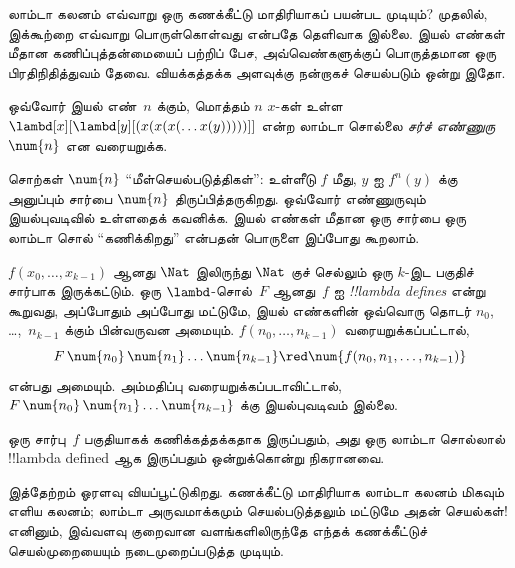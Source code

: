 \documentclass[../../../include/open-logic-section]{subfiles}
\begin{document}

லாம்டா கலனம் எவ்வாறு ஒரு கணக்கீட்டு மாதிரியாகப் பயன்பட முடியும்? முதலில்,
இக்கூற்றை எவ்வாறு பொருள்கொள்வது என்பதே தெளிவாக இல்லை. இயல் எண்கள் மீதான
கணிப்புத்தன்மையைப் பற்றிப் பேச, அவ்வெண்களுக்குப் பொருத்தமான ஒரு பிரதிநிதித்துவம்
தேவை. வியக்கத்தக்க அளவுக்கு நன்றாகச் செயல்படும் ஒன்று இதோ.

\begin{defn}
ஒவ்வோர் இயல் எண்~$n$ க்கும், மொத்தம் $n$ $x$-கள் உள்ள
$\lambd[x][\lambd[y][(x(x(x(\dots x(y)))))]]$ என்ற லாம்டா சொல்லை
\emph{சர்ச் எண்ணுரு}~$\num{n}$ என வரையறுக்க.
\end{defn}

சொற்கள் $\num{n}$ ``மீள்செயல்படுத்திகள்'': உள்ளீடு $f$ மீது, $y$ ஐ
$f^n(y)$ க்கு அனுப்பும் சார்பை $\num{n}$ திருப்பித்தருகிறது. ஒவ்வோர் எண்ணுருவும்
இயல்புவடிவில் உள்ளதைக் கவனிக்க. இயல் எண்கள் மீதான ஒரு சார்பை ஒரு லாம்டா சொல்
``கணிக்கிறது'' என்பதன் பொருளை இப்போது கூறலாம்.

\begin{defn}
$f(x_0, \dots, x_{k-1})$ ஆனது $\Nat$ இலிருந்து $\Nat$ குச் செல்லும் ஒரு
$k$-இட பகுதிச் சார்பாக இருக்கட்டும். ஒரு $\lambd$-சொல்~$F$ ஆனது~$f$ ஐ
\emph{!!{lambda define}s} என்று கூறுவது, அப்போதும் அப்போது மட்டுமே, இயல்
எண்களின் ஒவ்வொரு தொடர் $n_0$, \dots,~$n_{k-1}$ க்கும் பின்வருவன அமையும்.
$f(n_0, \dots, n_{k-1})$ வரையறுக்கப்பட்டால்,
\[
F\, \num{n_0}\, \num{n_1} \dots \num{n_{k-1}} \red \num{f(n_0, n_1, \dots,
  n_{k-1})}
\]
என்பது அமையும்.
அம்மதிப்பு வரையறுக்கப்படாவிட்டால், $F\, \num{n_0}\,
\num{n_1} \dots \num{n_{k-1}}$ க்கு இயல்புவடிவம் இல்லை.
\end{defn}

\begin{thm}
ஒரு சார்பு~$f$ பகுதியாகக் கணிக்கத்தக்கதாக இருப்பதும், அது ஒரு லாம்டா சொல்லால்
!!{lambda defined} ஆக இருப்பதும் ஒன்றுக்கொன்று நிகரானவை.
\end{thm}

\begin{explain}
இத்தேற்றம் ஓரளவு வியப்பூட்டுகிறது. கணக்கீட்டு மாதிரியாக லாம்டா கலனம் மிகவும்
எளிய கலனம்; லாம்டா அருவமாக்கமும் செயல்படுத்தலும் மட்டுமே அதன் செயல்கள்!{}
எனினும், இவ்வளவு குறைவான வளங்களிலிருந்தே எந்தக் கணக்கீட்டுச் செயல்முறையையும்
நடைமுறைப்படுத்த முடியும்.
\end{explain}
\end{document}
